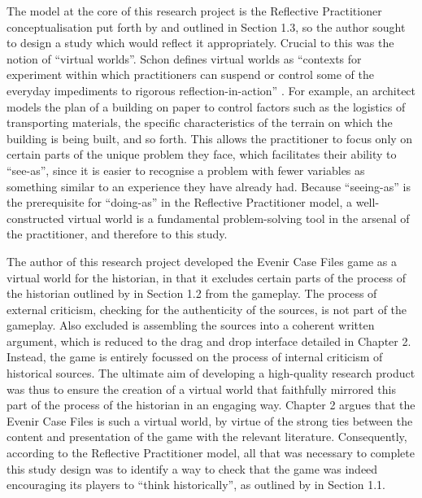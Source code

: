 \documentclass{l4proj}
\begin{document}
The model at the core of this research project is the Reflective Practitioner conceptualisation put forth by \citet{schon1984reflective} and outlined in Section 1.3, so the author sought to design a study which would reflect it appropriately. Crucial to this was the notion of “virtual worlds”. Schon defines virtual worlds as “contexts for experiment within which practitioners can suspend or control some of the everyday impediments to rigorous reflection-in-action” \citep{schon1984reflective}. For example, an architect models the plan of a building on paper to control factors such as the logistics of transporting materials, the specific characteristics of the terrain on which the building is being built, and so forth. This allows the practitioner to focus only on certain parts of the unique problem they face, which facilitates their ability to “see-as”, since it is easier to recognise a problem with fewer variables as something similar to an experience they have already had. Because “seeing-as” is the prerequisite for “doing-as” in the Reflective Practitioner model, a well-constructed virtual world is a fundamental problem-solving tool in the arsenal of the practitioner, and therefore to this study. 

The author of this research project developed the Evenir Case Files game as a virtual world for the historian, in that it excludes certain parts of the process of the historian outlined by \citet{tosh2006pursuit} in Section 1.2 from the gameplay. The process of external criticism, checking for the authenticity of the sources, is not part of the gameplay. Also excluded is assembling the sources into a coherent written argument, which is reduced to the drag and drop interface detailed in Chapter 2. Instead, the game is entirely focussed on the process of internal criticism of historical sources. The ultimate aim of developing a high-quality research product was thus to ensure the creation of a virtual world that faithfully mirrored this part of the process of the historian in an engaging way. Chapter 2 argues that the Evenir Case Files is such a virtual world, by virtue of the strong ties between the content and presentation of the game with the relevant literature. Consequently, according to the Reflective Practitioner model, all that was necessary to complete this study design was to identify a way to check that the game was indeed encouraging its players to “think historically”, as outlined by \citet{willingham2008critical} in Section 1.1.
\end{document}
